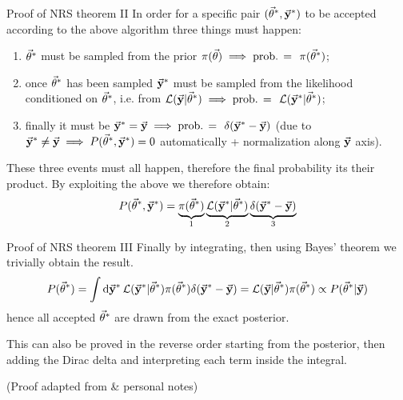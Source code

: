 \documentclass{beamer}
\theoremstyle{remark}
\renewcommand{\L}{\mathcal{L}}
\begin{document}
\begin{frame}{Proof of NRS theorem II}
In order for a specific pair $(\va{\theta}^*, \va{y}^*)$ to be accepted according to the above algorithm three things must happen:\pause
\begin{enumerate}[<+->]
    \item $\va{\theta}^*$ must be sampled from the prior $\pi(\va{\theta}) \implies \text{prob. =}\ \ \pi(\va{\theta}^*)$;
    \item once $\va{\theta}^*$ has been sampled $\va{y}^*$ must be sampled from the likelihood conditioned on $\va{\theta}^*$, i.e. from $\L(\va{y}|\va{\theta}^*)\implies \text{prob. =} \ \ \L(\va{y}^*|\va{\theta}^*)$;
    \item finally it must be $\va{y}^*=\va{y}\implies \text{prob. =} \ \ \delta(\va{y}^* - \va{y})$ (due to $\va{y}^*\neq\va{y}\implies P(\va{\theta}^*, \va{y}^*)=0$ automatically + normalization along $\va{y}$ axis).
\end{enumerate}

\pause[\thebeamerpauses]
These three events must all happen, therefore the final probability its their product. By exploiting the above we therefore obtain:
\begin{equation*}
    P(\va{\theta}^*, \va{y}^*) = \underbrace{\pi(\va{\theta}^*)}_{1} \underbrace{\L(\va{y}^*|\va{\theta}^*)}_{2}\underbrace{\delta(\va{y}^* - \va{y})}_{3}
\end{equation*}
\end{frame}

\begin{frame}{Proof of NRS theorem III}
Finally by integrating, then using Bayes' theorem we trivially obtain the result.
\begin{equation*}
    P(\va{\theta}^*) = \int\dd{\va{y}^*} \L(\va{y}^*|\va{\theta}^*) \pi(\va{\theta}^*) \delta(\va{y}^* - \va{y}) = \L(\va{y}|\va{\theta}^*) \pi(\va{\theta}^*)\propto P(\va{\theta}^*|\va{y})
\end{equation*}
hence all accepted $\va{\theta}^*$ are drawn from the exact posterior.

This can also be proved in the reverse order starting from the posterior, then adding the Dirac delta and interpreting each term inside the integral.


(Proof adapted from \cite{abc_slides} \& personal notes)
\end{frame}
\end{document}
